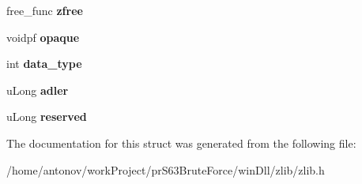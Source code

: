 \begin{DoxyCompactItemize}
\mbox{\label{structz__stream__s_a89eb750ade7f4f0b56bfdadf13344982}} 
free\+\_\+func {\bfseries zfree}
\item 
\mbox{\label{structz__stream__s_ab72467f908d2ce65d5b42ee6556ef8bb}} 
voidpf {\bfseries opaque}
\item 
\mbox{\label{structz__stream__s_a9d8f63877d7639a8bca60f9fc3704fc4}} 
int {\bfseries data\+\_\+type}
\item 
\mbox{\label{structz__stream__s_ade2217fe31e671be1257731883201223}} 
u\+Long {\bfseries adler}
\item 
\mbox{\label{structz__stream__s_add73791dd19b49c9c68f3f3d328c37db}} 
u\+Long {\bfseries reserved}
\end{DoxyCompactItemize}


The documentation for this struct was generated from the following file\+:\begin{DoxyCompactItemize}
\item 
/home/antonov/work\+Project/pr\+S63\+Brute\+Force/win\+Dll/zlib/zlib.\+h\end{DoxyCompactItemize}
